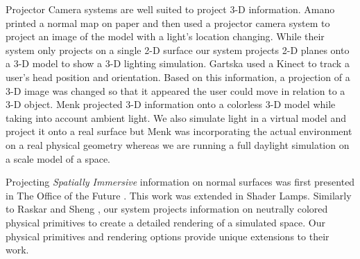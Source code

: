 \documentclass[10pt,twocolumn,letterpaper]{article}
\begin{document}
Projector Camera systems are well suited to project 3-D
information. Amano printed a normal map on paper and then used a
projector camera system to project an image of the model with a
light's location changing\cite{DBLP:conf/cvpr/Amano12}.  While their
system only projects on a single 2-D surface our system projects 2-D
planes onto a 3-D model to show a 3-D lighting simulation.  Gartska
used a Kinect to track a user's head position and
orientation\cite{Garstka_Peters_2004}.  Based on this information, a
projection of a 3-D image was changed so that it appeared the user
could move in relation to a 3-D object.  Menk \cite{menkandkoch} projected
3-D information onto a colorless 3-D model while taking into account
ambient light.  We also simulate light in a virtual model and project
it onto a real surface but Menk was incorporating the actual
environment on a real physical geometry whereas we are running a full
daylight simulation on a scale model of a space.

Projecting \emph{Spatially Immersive} information on normal surfaces was first 
presented in The Office of the Future \cite{Raskar:1998:OFU:280814.280861}.  This work was extended in Shader Lamps\cite{Raskar:2001:SLA}.
Similarly to Raskar \cite{Raskar:2001:SLA} and Sheng \cite{sheng_TVCG}, 
our system projects information on neutrally colored physical primitives
to create a detailed rendering of a simulated space.  Our physical primitives
and rendering options provide unique extensions to their work.
\end{document}
